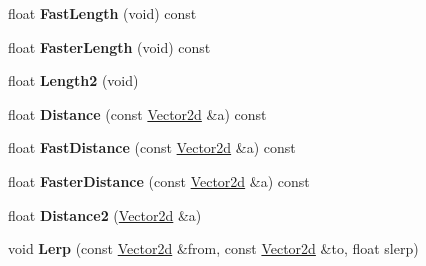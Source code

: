 \begin{DoxyCompactItemize}
\item 
\hypertarget{class_convex_decomposition_1_1_vector2d_a633663071b1ad3d8db39309d5fbae685}{float {\bfseries Fast\+Length} (void) const }\label{class_convex_decomposition_1_1_vector2d_a633663071b1ad3d8db39309d5fbae685}

\item 
\hypertarget{class_convex_decomposition_1_1_vector2d_ad083a2884f1bbbeea14a0de00cbaf2fd}{float {\bfseries Faster\+Length} (void) const }\label{class_convex_decomposition_1_1_vector2d_ad083a2884f1bbbeea14a0de00cbaf2fd}

\item 
\hypertarget{class_convex_decomposition_1_1_vector2d_aedfa7806c36782b1b6277f5f516dd960}{float {\bfseries Length2} (void)}\label{class_convex_decomposition_1_1_vector2d_aedfa7806c36782b1b6277f5f516dd960}

\item 
\hypertarget{class_convex_decomposition_1_1_vector2d_aa4cb4bf265c6663f3977e5b5fc2b4394}{float {\bfseries Distance} (const \hyperlink{class_convex_decomposition_1_1_vector2d}{Vector2d} \&a) const }\label{class_convex_decomposition_1_1_vector2d_aa4cb4bf265c6663f3977e5b5fc2b4394}

\item 
\hypertarget{class_convex_decomposition_1_1_vector2d_a8e4fc0d4e43aa87b00b2924c4ec14229}{float {\bfseries Fast\+Distance} (const \hyperlink{class_convex_decomposition_1_1_vector2d}{Vector2d} \&a) const }\label{class_convex_decomposition_1_1_vector2d_a8e4fc0d4e43aa87b00b2924c4ec14229}

\item 
\hypertarget{class_convex_decomposition_1_1_vector2d_aac2f27188483315abeb497e99c99eec3}{float {\bfseries Faster\+Distance} (const \hyperlink{class_convex_decomposition_1_1_vector2d}{Vector2d} \&a) const }\label{class_convex_decomposition_1_1_vector2d_aac2f27188483315abeb497e99c99eec3}

\item 
\hypertarget{class_convex_decomposition_1_1_vector2d_a702431c6bdd2a27848acbf51deae63eb}{float {\bfseries Distance2} (\hyperlink{class_convex_decomposition_1_1_vector2d}{Vector2d} \&a)}\label{class_convex_decomposition_1_1_vector2d_a702431c6bdd2a27848acbf51deae63eb}

\item 
\hypertarget{class_convex_decomposition_1_1_vector2d_af894d6484d18b9c8924c99698e69e247}{void {\bfseries Lerp} (const \hyperlink{class_convex_decomposition_1_1_vector2d}{Vector2d} \&from, const \hyperlink{class_convex_decomposition_1_1_vector2d}{Vector2d} \&to, float slerp)}\label{class_convex_decomposition_1_1_vector2d_af894d6484d18b9c8924c99698e69e247}


\end{DoxyCompactItemize}
